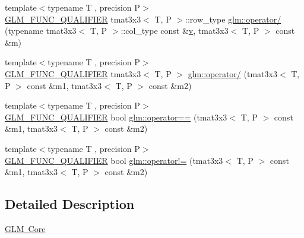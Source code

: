 \begin{DoxyCompactItemize}
\item 
{\footnotesize template$<$typename T , precision P$>$ }\\\mbox{\hyperlink{setup_8hpp_a33fdea6f91c5f834105f7415e2a64407}{G\+L\+M\+\_\+\+F\+U\+N\+C\+\_\+\+Q\+U\+A\+L\+I\+F\+I\+ER}} tmat3x3$<$ T, P $>$\+::row\+\_\+type \mbox{\hyperlink{namespaceglm_a8c3f939040ea3ca3707ce7d0b36b9b91}{glm\+::operator/}} (typename tmat3x3$<$ T, P $>$\+::col\+\_\+type const \&\mbox{\hyperlink{glad_8h_a14cfbe2fc2234f5504618905b69d1e06}{v}}, tmat3x3$<$ T, P $>$ const \&m)
\item 
{\footnotesize template$<$typename T , precision P$>$ }\\\mbox{\hyperlink{setup_8hpp_a33fdea6f91c5f834105f7415e2a64407}{G\+L\+M\+\_\+\+F\+U\+N\+C\+\_\+\+Q\+U\+A\+L\+I\+F\+I\+ER}} tmat3x3$<$ T, P $>$ \mbox{\hyperlink{namespaceglm_a5671c0e99b001cb443a8f05a62985ccf}{glm\+::operator/}} (tmat3x3$<$ T, P $>$ const \&m1, tmat3x3$<$ T, P $>$ const \&m2)
\item 
{\footnotesize template$<$typename T , precision P$>$ }\\\mbox{\hyperlink{setup_8hpp_a33fdea6f91c5f834105f7415e2a64407}{G\+L\+M\+\_\+\+F\+U\+N\+C\+\_\+\+Q\+U\+A\+L\+I\+F\+I\+ER}} bool \mbox{\hyperlink{namespaceglm_aaa61456c0ed2eed3acbf27b2ab797dee}{glm\+::operator==}} (tmat3x3$<$ T, P $>$ const \&m1, tmat3x3$<$ T, P $>$ const \&m2)
\item 
{\footnotesize template$<$typename T , precision P$>$ }\\\mbox{\hyperlink{setup_8hpp_a33fdea6f91c5f834105f7415e2a64407}{G\+L\+M\+\_\+\+F\+U\+N\+C\+\_\+\+Q\+U\+A\+L\+I\+F\+I\+ER}} bool \mbox{\hyperlink{namespaceglm_a14702a5f8ce75f873a43422e77b5c818}{glm\+::operator!=}} (tmat3x3$<$ T, P $>$ const \&m1, tmat3x3$<$ T, P $>$ const \&m2)
\end{DoxyCompactItemize}


\subsection{Detailed Description}
\mbox{\hyperlink{group__core}{G\+LM Core}} 